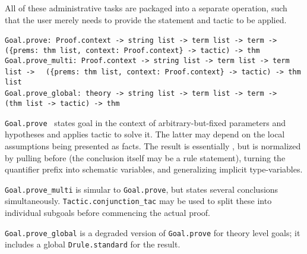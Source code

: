 \begin{isabellebody}
\begin{isamarkuptext}
  All of these administrative tasks are packaged into a separate
  operation, such that the user merely needs to provide the statement
  and tactic to be applied.%
\end{isamarkuptext}%
\isamarkuptrue%
%
\isadelimmlref
%
\endisadelimmlref
%
\isatagmlref
%
\begin{isamarkuptext}%
\begin{mldecls}
  \verb|Goal.prove: Proof.context -> string list -> term list -> term ->|\isasep\isanewline%
\verb|  ({prems: thm list, context: Proof.context} -> tactic) -> thm| \\
  \verb|Goal.prove_multi: Proof.context -> string list -> term list -> term list ->|\isasep\isanewline%
\verb|  ({prems: thm list, context: Proof.context} -> tactic) -> thm list| \\
  \verb|Goal.prove_global: theory -> string list -> term list -> term ->|\isasep\isanewline%
\verb|  (thm list -> tactic) -> thm| \\
  \end{mldecls}

  \begin{description}

  \item \verb|Goal.prove|~ states goal  in the context of arbitrary-but-fixed parameters 
  and hypotheses  and applies tactic  to
  solve it.  The latter may depend on the local assumptions being
  presented as facts.  The result is essentially , but is normalized by pulling \isa{{\isasymAnd}} before \isa{{\isasymLongrightarrow}}
  (the conclusion  itself may be a rule statement), turning
  the quantifier prefix into schematic variables, and generalizing
  implicit type-variables.

  \item \verb|Goal.prove_multi| is simular to \verb|Goal.prove|, but
  states several conclusions simultaneously.  \verb|Tactic.conjunction_tac| may be used to split these into individual
  subgoals before commencing the actual proof.

  \item \verb|Goal.prove_global| is a degraded version of \verb|Goal.prove| for theory level goals; it includes a global \verb|Drule.standard| for the result.

  \end{description}%
\end{isamarkuptext}%
\isamarkuptrue%
%
\endisatagmlref
{\isafoldmlref}%
%
\isadelimmlref
%
\endisadelimmlref
%
\isadelimtheory
%
\endisadelimtheory
%
\isatagtheory
{}\isamarkupfalse%
%
\endisatagtheory
{\isafoldtheory}%
%
\isadelimtheory
%
\endisadelimtheory
\isanewline
\isanewline
\end{isabellebody}%
